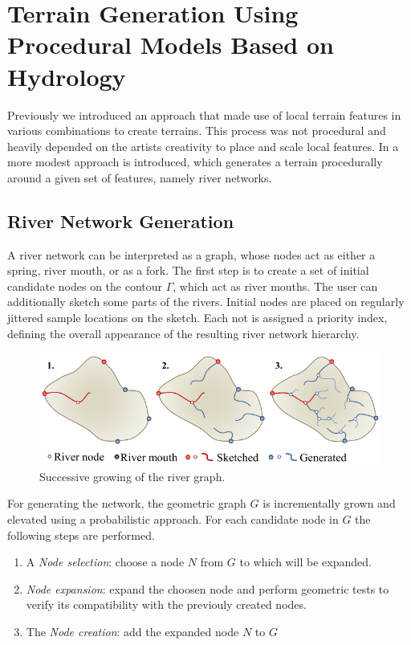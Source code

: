 \section{Terrain Generation Using Procedural Models Based on Hydrology}
\label{sec:Hydrology}
Previously we introduced an approach that made use of local terrain features in various combinations to create terrains. This process was not procedural and heavily depended on the artists creativity to place and scale local features. In \cite{Genevaux:2013:TGU:2461912.2461996} a more modest approach is introduced, which generates a terrain procedurally around a given set of features, namely river networks.
 
\subsection{River Network Generation}
A river network can be interpreted as a graph, whose nodes act as either a spring, river mouth, or as a fork. 
The first step is to create a set of initial candidate nodes on the contour $\Gamma$, which act as river mouths. The user can additionally sketch some parts of the rivers. Initial nodes are placed on regularly jittered sample locations on the sketch. Each not is assigned a priority index, defining the overall appearance of the resulting river network hierarchy. 

\begin{figure}[htb]
	\centering
	\includegraphics[width=\linewidth]{GGG13/river_network_sketch}
	\caption{Successive growing of the river graph. }
	\label{fig:river_network_sketch}
\end{figure}

For generating the network, the geometric graph $G$ is incrementally grown and elevated using a probabilistic approach. For each candidate node in $G$ the following steps are performed. 
\begin{enumerate}
	\item A \textit{Node selection}: choose a node $N$ from $G$ to which will be expanded.
	\item \textit{Node expansion}: expand the choosen node and perform geometric tests to verify its compatibility with the previouly created nodes. 
	\item The \textit{Node creation}: add the expanded node $N$ to $G$ 
\end{enumerate}

